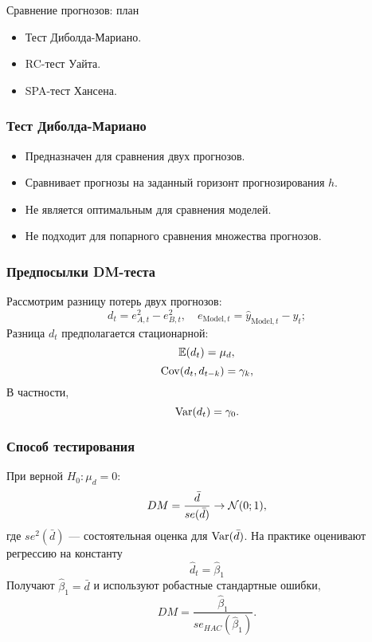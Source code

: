 
\begin{frame} %


\end{frame}



\begin{frame}{Сравнение прогнозов: план}
  \begin{itemize}[<+->]
    \item Тест Диболда-Мариано.
    \item RC-тест Уайта.
    \item SPA-тест Хансена. 
  \end{itemize}

\end{frame}

\begin{frame}
  \frametitle{Тест Диболда-Мариано}

  \begin{itemize}[<+->]
    \item Предназначен для сравнения \alert{двух} прогнозов.
    \item Сравнивает прогнозы на \alert{заданный горизонт} прогнозирования $h$.
    \item Не является оптимальным для \alert{сравнения моделей}. 
    \item Не подходит для \alert{попарного} сравнения множества прогнозов.
  \end{itemize}
  
\end{frame}

\begin{frame}
  \frametitle{Предпосылки DM-теста}

  Рассмотрим \alert{разницу потерь} двух прогнозов:
  \[
  d_t = e_{A,t}^2 - e_{B,t}^2, \quad e_{\text{Model},t} = \hat y_{\text{Model},t} - y_t;
  \]
  \pause
  Разница $d_t$ предполагается \alert{стационарной}:\pause
  \[
  \mathbb{E}(d_t) = \mu_d,
  \]
  \pause 
  \[
  \operatorname{Cov}(d_t, d_{t-k}) = \gamma_k,    
  \] \pause
  В частности,
  \[
  \operatorname{Var}(d_t) = \gamma_0.    
  \]
  
\end{frame}

\begin{frame}
    \frametitle{Способ тестирования}
    При верной $H_0: \mu_d = 0$:
    \[
       DM = \frac{\bar d}{se(\bar d)} \to \mathcal{N}(0;1),
    \]
    где $se^2(\bar d)$ — состоятельная оценка для $\operatorname{Var}(\bar d)$.
    \pause 
    На практике оценивают регрессию на константу
    \[
    \hat d_t = \hat \beta_1
    \]
    \pause 
    Получают $\hat\beta_1 = \bar d$ и используют \alert{робастные стандартные ошибки},
    \[
        DM = \frac{\hat \beta_1}{se_{HAC}(\hat\beta_1)}.
    \]

\end{frame}



